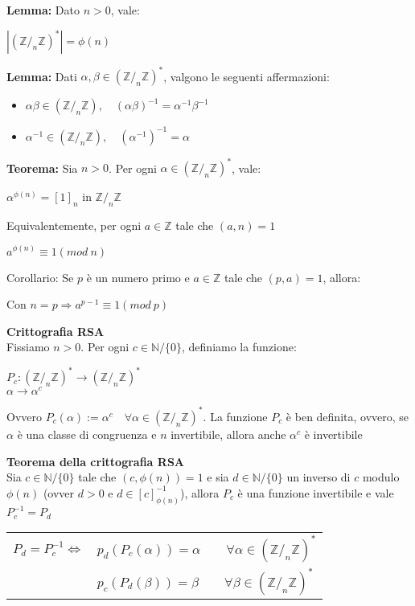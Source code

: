 \documentclass[11pt, letterpaper]{article}
\begin{document}
\textbf{Lemma:} Dato $n>0$, vale:
\begin{center}
    $|(\mathbb{Z}/_{n}\mathbb{Z})^{*}|=\phi(n)$
\end{center}

\textbf{Lemma:} Dati $\alpha,\beta\in(\mathbb{Z}/_{n}\mathbb{Z})^{*}$, valgono le seguenti affermazioni:
\begin{itemize}
    \item $\alpha\beta\in(\mathbb{Z}/_{n}\mathbb{Z}),\quad (\alpha\beta)^{-1}=\alpha^{-1}\beta^{-1}$
    \item $\alpha^{-1}\in(\mathbb{Z}/_{n}\mathbb{Z}),\quad (\alpha^{-1})^{-1}=\alpha$
\end{itemize}

\textbf{Teorema:} Sia $n>0$. Per ogni $\alpha\in(\mathbb{Z}/_{n}\mathbb{Z})^{*}$, vale:
\begin{center}
    $\alpha^{\phi(n)}=[1]_{n}$ in $\mathbb{Z}/_{n}\mathbb{Z}$
\end{center}
Equivalentemente, per ogni $a\in\mathbb{Z}$ tale che $(a,n)=1$
\begin{center}
    $a^{\phi(n)}\equiv 1(mod\ n)$
\end{center}

Corollario: Se $p$ è un numero primo e $a\in\mathbb{Z}$ tale che $(p,a)=1$, allora:
\begin{center}
    Con $n=p\Rightarrow a^{p-1}\equiv 1(mod\ p)$
\end{center}

\newpage
{}
\textbf{Crittografia RSA}\\
Fissiamo  $n>0$. Per ogni $c\in\mathbb{N}/\{0\}$, definiamo la funzione:
\begin{center}
    $P_{c}:(\mathbb{Z}/_{n}\mathbb{Z})^{*}\rightarrow(\mathbb{Z}/_{n}\mathbb{Z})^{*}$\\
    $\alpha\rightarrow\alpha^{c}$
\end{center}
Ovvero $P_{c}(\alpha):= \alpha^{c}\quad\forall\alpha\in(\mathbb{Z}/_{n}\mathbb{Z})^{*}$. La funzione $P_{c}$ è
ben definita, ovvero, se $\alpha$ è una classe di congruenza e $n$ invertibile, allora anche $\alpha^{c}$ è 
invertibile

\textbf{Teorema della crittografia RSA}\\ Sia $c\in\mathbb{N}/\{0\}$ tale che $(c,\phi(n))=1$ e sia $d\in\mathbb{N}
/\{0\}$ un inverso di $c$ modulo $\phi(n)$ (ovver $d>0$ e $d\in[c]^{-1}_{\phi(n)}$), allora $P_{c}$ è una funzione
invertibile e vale $P_{c}^{-1}=P_{d}$
\begin{center}
    \begin{tabular}{c l}
        $P_{d}=P_{c}^{-1}\Leftrightarrow$ & $p_{d}(P_{c}(\alpha))=\alpha\qquad\forall\alpha\in(\mathbb{Z}/_{n}
        \mathbb{Z})^{*}$\\
        & $p_{c}(P_{d}(\beta))=\beta\qquad\forall\beta\in(\mathbb{Z}/_{n}\mathbb{Z})^{*}$\\
    \end{tabular}
\end{center}
\end{document}
